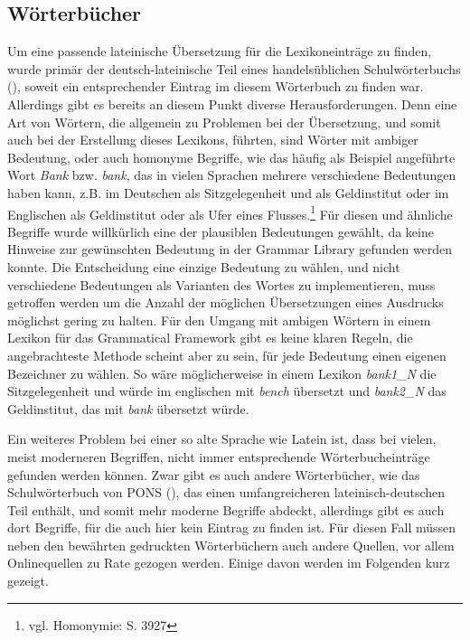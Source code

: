 \documentclass[fontsize=12pt,abstract=on,titlepage,bibliography=totoc,ngerman,listof=totoc]{scrreprt}
\begin{document}
\subsection{Wörterbücher}
\label{subsec:woerterbuch}
Um eine passende lateinische Übersetzung für die Lexikoneinträge zu finden, wurde primär der deutsch-lateinische Teil eines handelsüblichen Schulwörterbuchs (\cite{LANGENSCHEIDT1981}), soweit ein entsprechender Eintrag im diesem Wörterbuch zu finden war. Allerdings gibt es bereits an diesem Punkt diverse Herausforderungen. Denn eine Art von Wörtern, die allgemein zu Problemen bei der Übersetzung, und somit auch bei der Erstellung dieses Lexikons, führten, sind Wörter mit ambiger Bedeutung, oder auch homonyme Begriffe, wie das häufig als Beispiel angeführte Wort \textit{Bank} bzw. \textit{bank}, das in vielen Sprachen mehrere verschiedene Bedeutungen haben kann, z.B. im Deutschen als Sitzgelegenheit und als Geldinstitut oder im Englischen als Geldinstitut oder als Ufer eines Flusses.\footnote{vgl. \cite{METZLER2004} Homonymie: S. 3927} Für diesen und ähnliche Begriffe wurde willkürlich eine der plausiblen Bedeutungen gewählt, da keine Hinweise zur gewünschten Bedeutung in der Grammar Library gefunden werden konnte. Die Entscheidung eine einzige Bedeutung zu wählen, und nicht verschiedene Bedeutungen als Varianten des Wortes zu implementieren, muss getroffen werden um die Anzahl der möglichen Übersetzungen eines Ausdrucks möglichst gering zu halten. Für den Umgang mit ambigen Wörtern in einem Lexikon für das Grammatical Framework gibt es keine klaren Regeln, die angebrachteste Methode scheint aber zu sein, für jede Bedeutung einen eigenen Bezeichner zu wählen. So wäre möglicherweise in einem Lexikon \textit{bank1\_N} die Sitzgelegenheit und würde im englischen mit \textit{bench} übersetzt und \textit{bank2\_N} das Geldinstitut, das mit \textit{bank} übersetzt würde.\par
Ein weiteres Problem bei einer so alte Sprache wie Latein ist, dass bei vielen, meist moderneren Begriffen, nicht immer entsprechende Wörterbucheinträge gefunden werden können. Zwar gibt es auch andere Wörterbücher, wie das Schulwörterbuch von PONS (\cite{PONS2012}), das einen umfangreicheren lateinisch-deutschen Teil enthält, und somit mehr moderne Begriffe abdeckt, allerdings gibt es auch dort Begriffe, für die auch hier kein Eintrag zu finden ist. Für diesen Fall müssen neben den bewährten gedruckten Wörterbüchern auch andere Quellen, vor allem Onlinequellen zu Rate gezogen werden. Einige davon werden im Folgenden kurz gezeigt.\par
\end{document}

